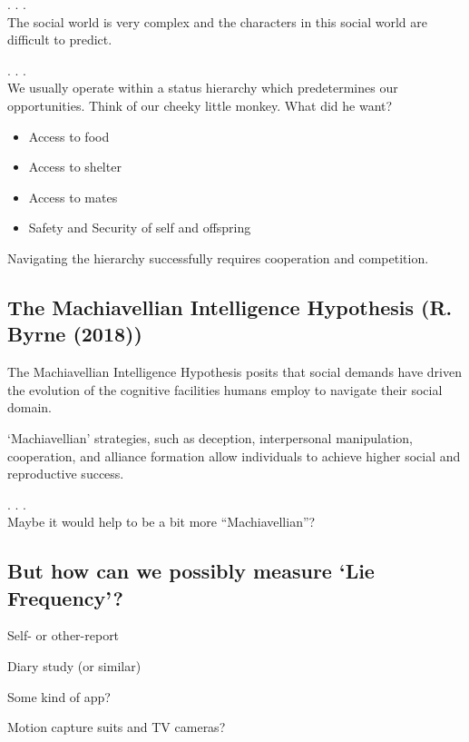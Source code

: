 \documentclass[
  letterpaper,
  DIV=11,
  numbers=noendperiod]{scrartcl}
\providecommand{\tightlist}{%
  \setlength{\itemsep}{0pt}\setlength{\parskip}{0pt}}\usepackage{longtable,booktabs,array}
\begin{document}
. . .\\
The social world is very complex and the characters in this social world
are difficult to predict.

. . .\\
We usually operate within a status hierarchy which predetermines our
opportunities. Think of our cheeky little monkey. What did he want?

\begin{itemize}
\tightlist
\item
  Access to food
\item
  Access to shelter
\item
  Access to mates
\item
  Safety and Security of self and offspring
\end{itemize}

{Navigating the hierarchy successfully requires cooperation and
competition.}

\hypertarget{the-machiavellian-intelligence-hypothesis-byrne2018}{%
\subsection{The Machiavellian Intelligence Hypothesis (R. Byrne
(2018))}\label{the-machiavellian-intelligence-hypothesis-byrne2018}}

The Machiavellian Intelligence Hypothesis posits that social demands
have driven the evolution of the cognitive facilities humans employ to
navigate their social domain.

`Machiavellian' strategies, such as deception, interpersonal
manipulation, cooperation, and alliance formation allow individuals to
achieve higher social and reproductive success.

. . .\\

{Maybe it would help to be a bit more ``Machiavellian''?}

\hypertarget{but-how-can-we-possibly-measure-lie-frequency}{%
\subsection{But how can we possibly measure `Lie
Frequency'?}\label{but-how-can-we-possibly-measure-lie-frequency}}

Self- or other-report

Diary study (or similar)

Some kind of app?

Motion capture suits and TV cameras?
\end{document}
